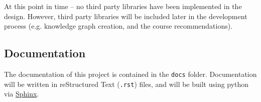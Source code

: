 \documentclass[12pt]{article}
\begin{document}
    At this point in time -- no third party libraries have been implemented in the design. However, third party libraries will be included later in the development process (e.g. knowledge graph creation, and the course recommendations).

    \subsection{Documentation}
    \label{subsec:docs}

    The documentation of this project is contained in the {\tt{docs}} folder. Documentation will be written in reStructured Text ({\tt{.rst}}) files, and will be built using python via \href{https://www.sphinx-doc.org/en/master/}{Sphinx}.
    
    
    


    \newpage
    
    
    
    
\end{document}
